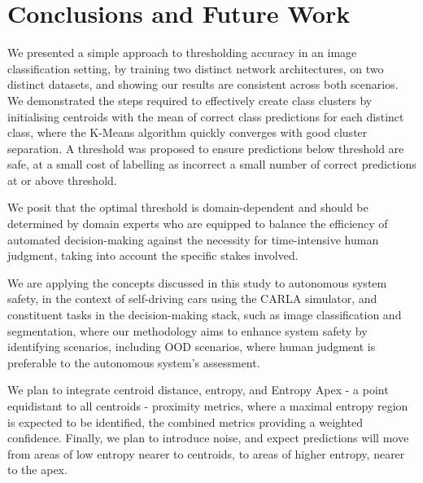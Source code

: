 
\section{Conclusions and Future Work}

We presented a simple approach to thresholding accuracy in an image classification setting, by training two distinct network architectures, on two distinct datasets, and showing our results are consistent across both scenarios.
We demonstrated the steps required to effectively create class clusters by initialising centroids with the mean of correct class predictions for each distinct class, where the K-Means algorithm quickly converges with good cluster separation.
A threshold was proposed to ensure predictions below threshold are safe, at a small cost of labelling as incorrect a small number of correct predictions at or above threshold.

We posit that the optimal threshold is domain-dependent and should be determined by domain experts who are equipped to balance the efficiency of automated decision-making against the necessity for time-intensive human judgment, taking into account the specific stakes involved.

We are applying the concepts discussed in this study to autonomous system safety, in the context of self-driving cars using the CARLA simulator, and constituent tasks in the decision-making stack, such as image classification and segmentation, where our methodology aims to enhance system safety by identifying scenarios, including OOD scenarios, where human judgment is preferable to the autonomous system’s assessment.



We plan to integrate centroid distance, entropy, and Entropy Apex - a point equidistant to all centroids - proximity metrics, where a maximal entropy region is expected to be identified, the combined metrics providing a weighted confidence. Finally, we plan to introduce noise, and expect predictions will move from areas of low entropy nearer to centroids, to areas of higher entropy, nearer to the apex. 